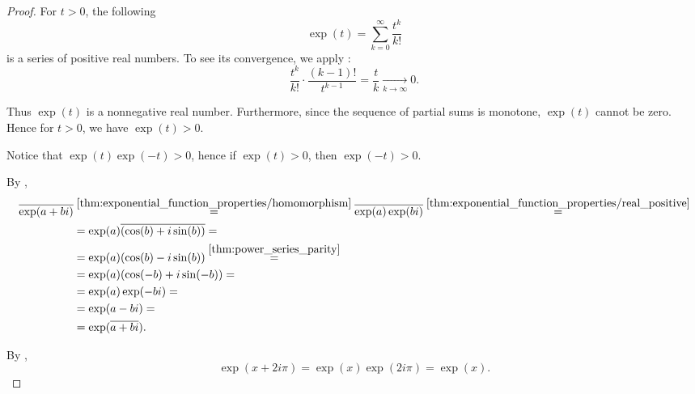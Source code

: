 \begin{proof}
   For \( t > 0 \), the following
  \begin{equation*}
    \exp(t) = \sum_{k=0}^\infty \frac {t^k} {k!}
  \end{equation*}
  is a series of positive real numbers. To see its convergence, we apply :
  \begin{equation*}
    \frac {t^k} {k!} \cdot \frac {(k-1)!} {t^{k-1}}
    =
    \frac t k
    \xrightarrow[k \to \infty]{} 0.
  \end{equation*}

  Thus \( \exp(t) \) is a nonnegative real number. Furthermore, since the sequence of partial sums is monotone, \( \exp(t) \) cannot be zero. Hence for \( t > 0 \), we have \( \exp(t) > 0 \).

  Notice that \( \exp(t) \exp(-t) > 0 \), hence if \( \exp(t) > 0 \), then \( \exp(-t) > 0 \).

   By ,
  \begin{align*}
    \overline{\exp(a + bi)}
     & \overset {\ref{thm:exponential_function_properties/homomorphism}} =
    \overline{\exp(a) \exp(bi)}
    \overset {\ref{thm:exponential_function_properties/real_positive}} =   \\ &=
    \exp(a) \overline{(\cos(b) + i\sin(b))}
    =                                                                      \\ &=
    \exp(a) (\cos(b) - i\sin(b))
    \overset {\ref{thm:power_series_parity}} =                             \\ &=
    \exp(a) (\cos(-b) + i\sin(-b))
    =                                                                      \\ &=
    \exp(a) \exp(-bi)
    =                                                                      \\ &=
    \exp(a - bi)
    =                                                                      \\ &=
    \exp(\overline{a + bi}).
  \end{align*}

   By ,
  \begin{equation*}
    \exp(x + 2i\pi) = \exp(x) \exp(2i\pi) = \exp(x).
  \end{equation*}


\end{proof}
